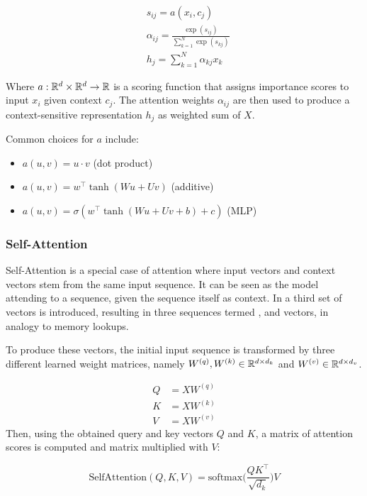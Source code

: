 \begin{align}
     & s_{ij} = a(x_i, c_j)                                         \\
     & \alpha_{ij} = \frac{\exp(s_{ij})}{\sum_{k=1}^N \exp(s_{kj})} \\
     & h_j = \sum_{k=1}^N \alpha_{kj} x_k
\end{align}

Where $a: \mathbb{R}^d \times \mathbb{R}^d \rightarrow \mathbb{R}$ is a scoring function that assigns importance scores to input $x_i$ given context $c_j$. The attention weights $\alpha_{ij}$ are then used to produce a context-sensitive representation $h_j$ as weighted sum of $X$.

Common choices for $a$ include:
\begin{itemize}
    \item $a(u, v) = u \cdot v$ (dot product)
    \item $a(u, v) = w^\top \tanh(W u + U v)$ (additive)
    \item $a(u, v) = \sigma(w^\top \tanh(W u + U v + b) + c)$ (MLP)
\end{itemize}

\subsubsection{Self-Attention}
Self-Attention is a special case of attention where input vectors and context vectors stem from the same input sequence. It can be seen as the model attending to a sequence, given the sequence itself as context. In \cite{vaswani2017attention} a third set of  vectors is introduced, resulting in three sequences termed ,  and  vectors, in analogy to memory lookups.

To produce these vectors, the initial input sequence is transformed by three different learned weight matrices, namely $W^{(q)}, W^{(k)} \in \mathbb{R}^{d \times d_k}$ and $W^{(v)} \in \mathbb{R}^{d \times d_v}$.

\begin{align}
    Q & = X W^{(q)} \\
    K & = X W^{(k)} \\
    V & = X W^{(v)}
\end{align}
Then, using the obtained query and key vectors $Q$ and $K$, a matrix of attention scores is computed and matrix multiplied with $V$:

\begin{equation}
    \text{SelfAttention}(Q, K, V) = \text{softmax}\bigg(\frac{Q K^\top}{\sqrt{d_k}}\bigg) V
\end{equation}

